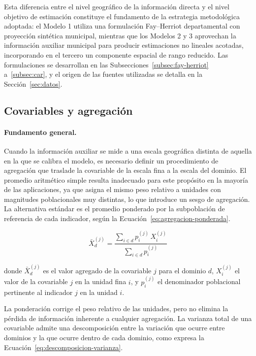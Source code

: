 Esta diferencia entre el nivel geográfico de la información directa y el nivel objetivo de estimación constituye el fundamento de la estrategia metodológica adoptada: el Modelo 1 utiliza una formulación Fay--Herriot departamental con proyección sintética municipal, mientras que los Modelos 2 y 3 aprovechan la información auxiliar municipal para producir estimaciones no lineales acotadas, incorporando en el tercero un componente espacial de rango reducido. Las formulaciones se desarrollan en las Subsecciones~\ref{subsec:fay-herriot} a~\ref{subsec:car}, y el origen de las fuentes utilizadas se detalla en la Sección~\ref{sec:datos}.

\subsection{Covariables y agregación}
\label{subsec:covariables}

\paragraph{Fundamento general.}
Cuando la información auxiliar se mide a una escala geográfica distinta de aquella en la que se calibra el modelo, es necesario definir un procedimiento de agregación que traslade la covariable de la escala fina a la escala del dominio. El promedio aritmético simple resulta inadecuado para este propósito en la mayoría de las aplicaciones, ya que asigna el mismo peso relativo a unidades con magnitudes poblacionales muy distintas, lo que introduce un sesgo de agregación. La alternativa estándar es el promedio ponderado por la subpoblación de referencia de cada indicador, según la Ecuación~\ref{eq:agregacion-ponderada}.

\begin{equation}
    \bar{X}_{d}^{(j)} = \frac{\sum_{i \in d} p_i^{(j)}\, X_{i}^{(j)}}{\sum_{i \in d} p_i^{(j)}}
    \label{eq:agregacion-ponderada}
\end{equation}

\noindent donde $\bar{X}_{d}^{(j)}$ es el valor agregado de la covariable $j$ para el dominio $d$, $X_{i}^{(j)}$ el valor de la covariable $j$ en la unidad fina $i$, y $p_i^{(j)}$ el denominador poblacional pertinente al indicador $j$ en la unidad $i$.

La ponderación corrige el peso relativo de las unidades, pero no elimina la pérdida de información inherente a cualquier agregación. La varianza total de una covariable admite una descomposición entre la variación que ocurre entre dominios y la que ocurre dentro de cada dominio, como expresa la Ecuación~\ref{eq:descomposicion-varianza}.

